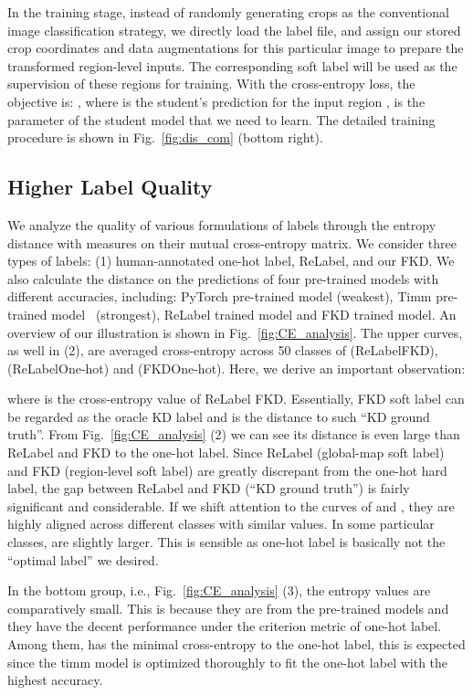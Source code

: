 \documentclass[10pt,twocolumn,letterpaper]{article}
\begin{document}
 In the training stage, instead of randomly generating crops as the conventional image classification strategy, we directly load the label file, and assign our stored crop coordinates and data augmentations for this particular image to prepare the transformed region-level inputs. The corresponding soft label will be used as the supervision of these regions for training. With the cross-entropy loss, the objective is: , where  is the student's prediction for the input region ,   is the parameter of the student model that we need to learn. The detailed training procedure is shown in Fig.~\ref{fig:dis_com} (bottom right).

\subsection{Higher Label Quality}

 We analyze the quality of various formulations of labels through the entropy distance with measures on their mutual cross-entropy matrix. We consider three types of labels: (1) human-annotated one-hot label, ReLabel, and our FKD. We also calculate the distance on the predictions of four pre-trained models with different accuracies, including: PyTorch pre-trained model (weakest), Timm pre-trained model~\cite{wightman2021resnet} (strongest), ReLabel trained model and FKD trained model. An overview of our illustration is shown in Fig.~\ref{fig:CE_analysis}. The upper curves, as well in (2), are averaged cross-entropy across 50 classes of (ReLabelFKD), (ReLabelOne-hot) and (FKDOne-hot). Here, we derive an important observation:

where  is the  cross-entropy value of ReLabel  FKD. Essentially, FKD soft label can be regarded as the oracle KD label and  is the distance to such ``KD ground truth''. From Fig.~\ref{fig:CE_analysis} (2) we can see its distance is even large than ReLabel and FKD to the one-hot label. Since ReLabel (global-map soft label) and FKD (region-level soft label) are greatly discrepant from the one-hot hard label, the gap between ReLabel and FKD (``KD ground truth'') is fairly significant and considerable. If we shift attention to the curves of  and , they are highly aligned across different classes with similar values. In some particular classes,  are slightly larger. This is sensible as one-hot label is basically not the ``optimal label'' we desired.

In the bottom group, i.e., Fig.~\ref{fig:CE_analysis} (3), the entropy values are comparatively small. This is because they are from the pre-trained models and they have the decent performance under the criterion metric of one-hot label. Among them,  has the minimal cross-entropy to the one-hot label, this is expected since the timm model is optimized thoroughly to fit the one-hot label with the highest accuracy. 
\end{document}
